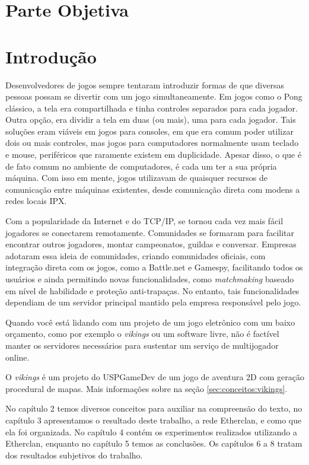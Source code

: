 \chapter*{Parte Objetiva}
\label{sec:parte_objetiva}
\chapter{Introdução}
\label{sec:intr}

Desenvolvedores de jogos sempre tentaram introduzir formas de que diversas
pessoas possam se divertir com um jogo simultaneamente. Em jogos como o Pong
clássico, a tela era compartilhada e tinha controles separados para cada 
jogador. Outra opção, era dividir a tela em duas (ou mais), uma para cada
jogador. Tais soluções eram viáveis em jogos para consoles, em que era comum
poder utilizar dois ou mais controles, mas jogos para computadores normalmente
usam teclado e mouse, periféricos que raramente existem em duplicidade.
Apesar disso, o que é de fato comum no ambiente de computadores, é cada um ter
a sua própria máquina. Com isso em mente, jogos utilizavam de quaisquer recursos
de comunicação entre máquinas existentes, desde comunicação direta com modens
a redes locais IPX.

Com a popularidade da Internet e do TCP/IP, se tornou cada vez mais fácil
jogadores se conectarem remotamente. Comunidades se formaram para facilitar
encontrar outros jogadores, montar campeonatos, guildas e conversar. Empresas
adotaram essa ideia de comunidades, criando comunidades oficiais, com integração
direta com os jogos, como a Battle.net e Gamespy, facilitando todos os usuários 
e ainda permitindo novas funcionalidades, como \textit{matchmaking} baseado em
nível de habilidade e proteção anti-trapaças. No entanto, tais funcionalidades
dependiam de um servidor principal mantido pela empresa responsável pelo jogo.

Quando você está lidando com um projeto de um jogo eletrônico com um baixo
orçamento, como por exemplo o \textit{vikings} ou um software livre, não é
factível manter os servidores necessários para sustentar um serviço de
multijogador online.

O \textit{vikings} é um projeto do USPGameDev de um jogo de aventura 2D com geração
procedural de mapas. Mais informações sobre na seção \ref{sec:conceitos:vikings}.

No capítulo 2 temos diversos conceitos para auxiliar na compreensão do texto,
no capítulo 3 apresentamos o resultado deste trabalho, a rede Etherclan, e como
que ela foi organizada. No capítulo 4 contém os experimentos realizados utilizando
a Etherclan, enquanto no capítulo 5 temos as conclusões. Os capítulos 6 a 8 tratam
dos resultados subjetivos do trabalho.


